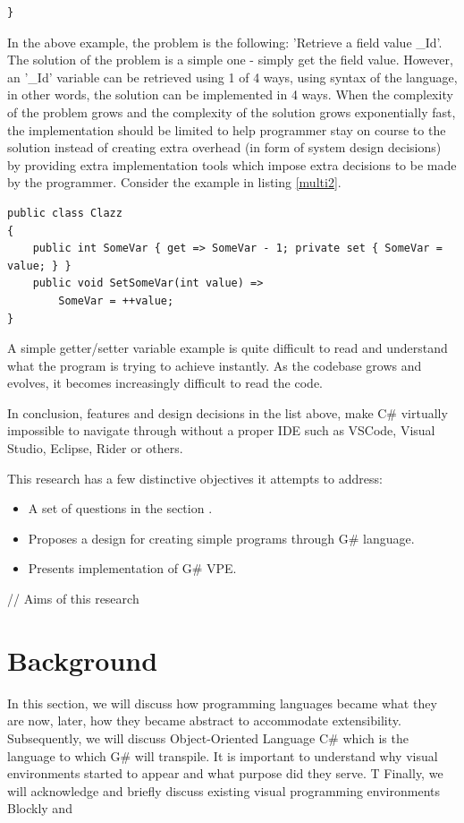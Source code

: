 \documentclass{article}
\begin{document}
\begin{itemize}
\begin{lstlisting}[frame=single, label=multi1, caption=Example C\# File notok.cs]
}
          \end{lstlisting}
          In the above example, the problem is the following: 'Retrieve a field value \_Id'.
          The solution of the problem is a simple one - simply get the field value. However, an '\_Id' variable can be retrieved using 1 of 4 ways, using syntax of the language, in other words, the solution can be implemented in 4 ways. When the complexity of the problem grows and the complexity of the solution grows exponentially fast, the implementation should be limited to help programmer stay on course to the solution instead of creating extra overhead (in form of system design decisions) by providing extra implementation tools which impose extra decisions to be made by the programmer. Consider the example in listing \ref*{multi2}.
          \begin{lstlisting}[frame=single, label=multi2, caption=Simple get/set Example C\# File reallynotok.cs]
public class Clazz
{
    public int SomeVar { get => SomeVar - 1; private set { SomeVar = value; } }
    public void SetSomeVar(int value) =>
        SomeVar = ++value;
}
            \end{lstlisting}
          A simple getter/setter variable example is quite difficult to read and understand what the program is trying to achieve instantly. As the codebase grows and evolves, it becomes increasingly difficult to read the code.
\end{itemize}
In conclusion, features and design decisions in the list above, make C\# virtually impossible to navigate through without a proper IDE such as VSCode, Visual Studio, Eclipse, Rider or others.

This research has a few distinctive objectives it attempts to address:
\begin{itemize}
    \item A set of questions in the section .
    \item Proposes a design for creating simple programs through G\# language.
    \item Presents implementation of G\# VPE.
\end{itemize}

// Aims of this research




\section{Background}
In this section, we will discuss how programming languages became what they are now, later, how they became abstract to accommodate extensibility.
Subsequently, we will discuss Object-Oriented Language C\# which is the language to which G\# will transpile.
It is important to understand why visual environments started to appear and what purpose did they serve. T
Finally, we will acknowledge and briefly discuss existing visual programming environments Blockly and 
\end{document}
